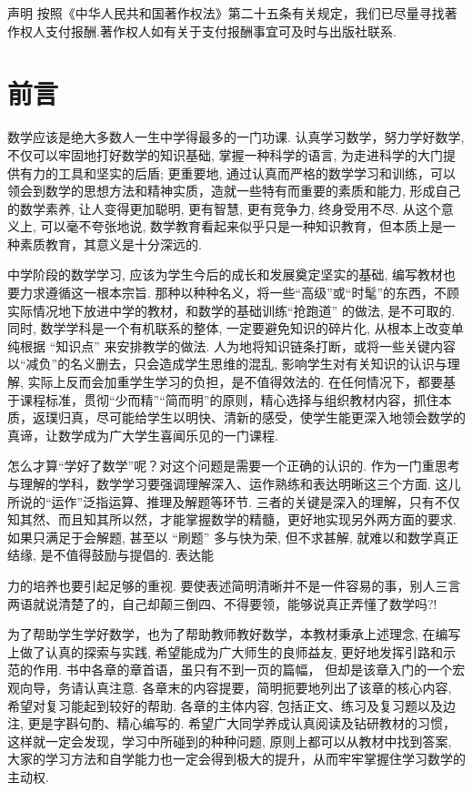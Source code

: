 \documentclass[10pt]{article}
\begin{document}
声明 按照《中华人民共和国著作权法》第二十五条有关规定，我们已尽量寻找著作权人支付报酬.著作权人如有关于支付报酬事宜可及时与出版社联系.

\section*{前言}

数学应该是绝大多数人一生中学得最多的一门功课. 认真学习数学，努力学好数学, 不仅可以牢固地打好数学的知识基础, 掌握一种科学的语言, 为走进科学的大门提供有力的工具和坚实的后盾; 更重要地, 通过认真而严格的数学学习和训练，可以领会到数学的思想方法和精神实质，造就一些特有而重要的素质和能力, 形成自己的数学素养, 让人变得更加聪明, 更有智慧, 更有竞争力, 终身受用不尽. 从这个意义上, 可以毫不夸张地说, 数学教育看起来似乎只是一种知识教育，但本质上是一种素质教育，其意义是十分深远的.

中学阶段的数学学习, 应该为学生今后的成长和发展奠定坚实的基础, 编写教材也要力求遵循这一根本宗旨. 那种以种种名义，将一些“高级”或“时髦”的东西，不顾实际情况地下放进中学的教材，和数学的基础训练“抢跑道” 的做法, 是不可取的. 同时, 数学学科是一个有机联系的整体, 一定要避免知识的碎片化, 从根本上改变单纯根据 “知识点” 来安排教学的做法. 人为地将知识链条打断，或将一些关键内容以“减负”的名义删去，只会造成学生思维的混乱, 影响学生对有关知识的认识与理解, 实际上反而会加重学生学习的负担，是不值得效法的. 在任何情况下，都要基于课程标准，贯彻“少而精”“简而明”的原则，精心选择与组织教材内容，抓住本质，返璞归真，尽可能给学生以明快、清新的感受，使学生能更深入地领会数学的真谛，让数学成为广大学生喜闻乐见的一门课程.

怎么才算“学好了数学”呢？对这个问题是需要一个正确的认识的. 作为一门重思考与理解的学科，数学学习要强调理解深入、运作熟练和表达明晰这三个方面. 这儿所说的“运作”泛指运算、推理及解题等环节. 三者的关键是深入的理解，只有不仅知其然、而且知其所以然，才能掌握数学的精髓，更好地实现另外两方面的要求. 如果只满足于会解题, 甚至以 “刷题” 多与快为荣, 但不求甚解, 就难以和数学真正结缘, 是不值得鼓励与提倡的. 表达能

力的培养也要引起足够的重视. 要使表述简明清晰并不是一件容易的事，别人三言两语就说清楚了的，自己却颠三倒四、不得要领，能够说真正弄懂了数学吗?!

为了帮助学生学好数学，也为了帮助教师教好数学，本教材秉承上述理念, 在编写上做了认真的探索与实践, 希望能成为广大师生的良师益友, 更好地发挥引路和示范的作用. 书中各章的章首语，虽只有不到一页的篇幅， 但却是该章入门的一个宏观向导，务请认真注意. 各章末的内容提要，简明扼要地列出了该章的核心内容, 希望对复习能起到较好的帮助. 各章的主体内容, 包括正文、练习及复习题以及边注, 更是字斟句酌、精心编写的. 希望广大同学养成认真阅读及钻研教材的习惯，这样就一定会发现，学习中所碰到的种种问题, 原则上都可以从教材中找到答案, 大家的学习方法和自学能力也一定会得到极大的提升，从而牢牢掌握住学习数学的主动权.
\end{document}
